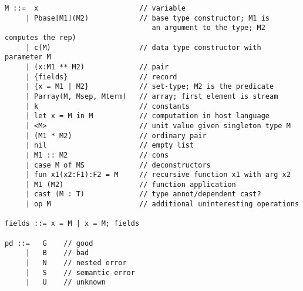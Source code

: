 {\small
\begin{verbatim}
M ::=  x                        // variable
     | Pbase[M1](M2)            // base type constructor; M1 is
                                   an argument to the type; M2 computes the rep)
     | c(M)                     // data type constructor with parameter M
     | (x:M1 ** M2)             // pair
     | {fields}                 // record
     | {x = M1 | M2}            // set-type; M2 is the predicate
     | Parray(M, Msep, Mterm)   // array; first element is stream
     | k                        // constants
     | let x = M in M           // computation in host language
     | <M>                      // unit value given singleton type M
     | (M1 * M2)                // ordinary pair
     | nil                      // empty list
     | M1 :: M2                 // cons
     | case M of MS             // deconstructors
     | fun x1(x2:F1):F2 = M     // recursive function x1 with arg x2
     | M1 (M2)                  // function application
     | cast (M : T)             // type annot/dependent cast?
     | op M                     // additional uninteresting operations
     
fields ::= x = M | x = M; fields

pd ::=   G    // good
     |   B    // bad
     |   N    // nested error
     |   S    // semantic error
     |   U    // unknown
\end{verbatim}
}
